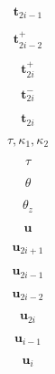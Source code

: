 \documentclass[a4paper,10pt,fleqn]{book}
\newcommand{\vect}[1]{\boldsymbol{#1}}
\begin{document}
\begin{equation}
\vect{t}_{2i-1}
\end{equation}


\begin{equation}
\vect{t}_{2i-2}^+
\end{equation}


\begin{equation}
\vect{t}_{2i}^+
\end{equation}


\begin{equation}
\vect{t}_{2i}^-
\end{equation}


\begin{equation}
\vect{t}_{2i}
\end{equation}


\begin{equation}
\tau,\kappa_1,\kappa_2
\end{equation}


\begin{equation}
\tau
\end{equation}


\begin{equation}
\theta
\end{equation}


\begin{equation}
\theta_z
\end{equation}


\begin{equation}
\vect{u}
\end{equation}


\begin{equation}
\vect{u}_{2i+1}
\end{equation}


\begin{equation}
\vect{u}_{2i-1}
\end{equation}


\begin{equation}
\vect{u}_{2i-2}
\end{equation}


\begin{equation}
\vect{u}_{2i}
\end{equation}


\begin{equation}
\vect{u}_{i-1}
\end{equation}


\begin{equation}
\vect{u}_i
\end{equation}
\end{document}
